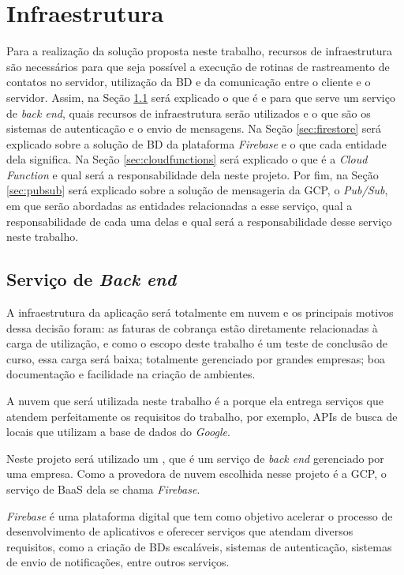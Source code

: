 \chapter{Infraestrutura}\label{chp:infraestrutura}

Para a realização da solução proposta neste trabalho, recursos de infraestrutura são necessários para que seja possível a execução de rotinas de rastreamento de contatos no servidor, utilização da BD e da comunicação entre o cliente e o servidor. Assim, na Seção \ref{sec:firebase} será explicado o que é e para que serve um serviço de \textit{back end}, quais recursos de infraestrutura serão utilizados e o que são os sistemas de autenticação e o envio de mensagens. Na Seção \ref{sec:firestore} será explicado sobre a solução de BD da plataforma \textit{Firebase} e o que cada entidade dela significa. Na Seção \ref{sec:cloudfunctions} será explicado o que é a \textit{Cloud Function} e qual será a responsabilidade dela neste projeto. Por fim, na Seção \ref{sec:pubsub} será explicado sobre a solução de mensageria da GCP, o \textit{Pub/Sub}, em que serão abordadas as entidades relacionadas a esse serviço, qual a responsabilidade de cada uma delas e qual será a responsabilidade desse serviço neste trabalho.

\section{Serviço de \textit{Back end}}\label{sec:firebase}

A infraestrutura da aplicação será totalmente em nuvem e os principais motivos dessa decisão foram: as faturas de cobrança estão diretamente relacionadas à carga de utilização, e como o escopo deste trabalho é um teste de conclusão de curso, essa carga será baixa; totalmente gerenciado por grandes empresas; boa documentação e facilidade na criação de ambientes.

A nuvem que será utilizada neste trabalho é a  porque ela entrega serviços que atendem perfeitamente os requisitos do trabalho, por exemplo, APIs de busca de locais que utilizam a base de dados do \textit{Google}.

Neste projeto será utilizado um , que é um serviço de \textit{back end} gerenciado por uma empresa. Como a provedora de nuvem escolhida nesse projeto é a GCP, o serviço de BaaS dela se chama \textit{Firebase}.

\textit{Firebase} é uma plataforma digital que tem como objetivo acelerar o processo de desenvolvimento de aplicativos e oferecer serviços que atendam diversos requisitos, como a criação de BDs escaláveis, sistemas de autenticação, sistemas de envio de notificações, entre outros serviços.

